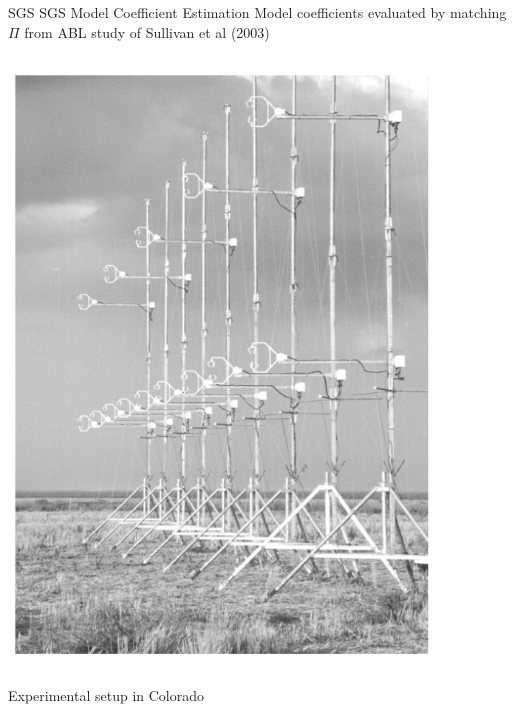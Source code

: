 \begin{frame}{SGS SGS Model Coefficient Estimation}
Model coefficients evaluated by matching $\Pi$ from ABL study of Sullivan et al (2003)    
	\begin{columns}
    \begin{column}{.4\textwidth}
    \begin{minipage}[c][.1\textheight][c]{\linewidth}
    \includegraphics[width=\textwidth]{apriori14}
    ~\\\tiny{Experimental setup in Colorado}
      \end{minipage}
    \end{column}
    \begin{column}{.6\textwidth}
    \vspace{-10pt}
      \begin{figure}

\end{figure}
\end{column}
\end{columns}
\end{frame}
